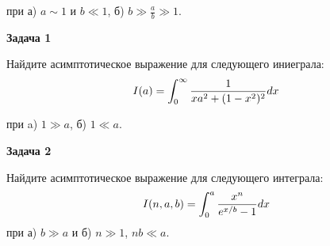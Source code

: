 \documentclass[a4paper,12pt]{article}
\begin{document}
\noindent при а) $a\sim 1$ и $b\ll 1$, б) $b\gg\frac{a}{b}\gg 1$.

\vspace{15pt}
\noindent \textbf{Задача 1}

\noindent Найдите асимптотическое выражение для следующего иниеграла:
\begin{equation}
\notag
I(a)=\int_{0}^{\infty}\frac{1}{xa^{2}+(1-x^{2})^{2}}dx	
\end{equation}

\noindent при a) $1\gg a$, б) $1\ll a$.

\vspace{15pt}
\noindent \textbf{Задача 2}

\noindent Найдите асимптотическое выражение для следующего интеграла:
\begin{equation}\notag
I(n,a,b)	=\int_{0}^{a}\frac{x^{n}}{e^{x/b}-1}dx
\end{equation}
\noindent при а) $b\gg a$ и б) $n\gg 1$, $nb\ll a$.
\end{document}
